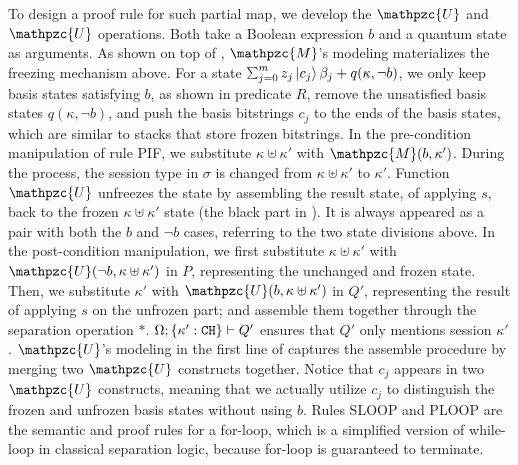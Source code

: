To design a proof rule for such partial map, we develop the $\mathpzc{U}$ and $\mathpzc{U}$ operations. Both take a Boolean expression $b$ and a quantum state as arguments. As shown on top of , $\mathpzc{M}$'s modeling materializes the freezing mechanism above. For a state $\scha{m}{z_j}{c_{j}}{\beta_j}+q(\kappa,\neg b)$, we only keep basis states satisfying $b$, as shown in predicate $R$, remove the unsatisfied basis states $q(\kappa,\neg b)$, and push the basis bitstrings $c_{j}$ to the ends of the basis states, which are similar to stacks that store frozen bitstrings.
In the pre-condition manipulation of rule \textsc{PIF}, we substitute $\kappa \uplus \kappa'$ with $\mathpzc{M}(b,\kappa')$. During the process, the session type in $\sigma$ is changed from $\kappa \uplus \kappa'$ to $\kappa'$.
Function $\mathpzc{U}$ unfreezes the state by assembling the result state, of applying $s$, back to the frozen $\kappa \uplus \kappa'$ state (the black part in ). It is always appeared as a pair with both the $b$ and $\neg b$ cases, referring to the two state divisions above. In the post-condition manipulation, we first substitute $\kappa \uplus \kappa'$ with $\mathpzc{U}(\neg b,\kappa \uplus \kappa')$ in $P$, representing the unchanged and frozen state. Then, we substitute $\kappa'$ with $\mathpzc{U}(b,\kappa \uplus \kappa')$ in $Q'$, representing the result of applying $s$ on the unfrozen part; and assemble them together through the separation operation $*$. 
$\Omega;\{\kappa' : \texttt{CH}\} \vdash Q'$ ensures that $Q'$ only mentions session $\kappa'$.
$\mathpzc{U}$'s modeling in the first line of  captures the assemble procedure by merging two $\mathpzc{U}$ constructs together. Notice that $c_{j}$ appears in two $\mathpzc{U}$ constructs, meaning that we actually utilize $c_j$ to distinguish the frozen and unfrozen basis states without using $b$.
Rules \textsc{SLOOP} and \textsc{PLOOP} are the semantic and proof rules for a for-loop, which is a simplified version of while-loop in classical separation logic, because for-loop is guaranteed to terminate.

